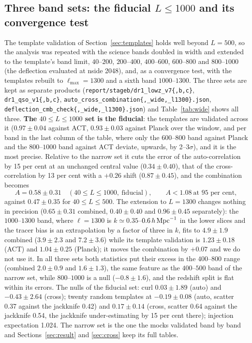 \documentclass[11pt,a4paper]{article}
\begin{document}
\subsection{Three band sets: the fiducial $L\le1000$ and its convergence test}
\label{sec:wide}
The template validation of Section~\ref{sec:templates} holds well beyond $L=500$, so the analysis was repeated with the science bands doubled in width and extended to the template's band limit, $40$--$200$, $200$--$400$, $400$--$600$, $600$--$800$ and $800$--$1000$ (the deflection evaluated at nside 2048), and, as a convergence test, with the templates rebuilt to $\ell_{\max}=1300$ and a sixth band $1000$--$1300$. The three sets are kept as separate products (\texttt{report/stageb/dr1\_lowz\_v7\{,b,c\}}, \texttt{dr1\_qso\_v1\{,b,c\}}, \texttt{auto\_cross\_combination\{,\_wide,\_l1300\}.json}, \texttt{deflection\_cmb\_check\{,\_wide,\_l1300\}.json}) and Table~\ref{tab:wide} shows all three. \textbf{The $40\le L\le1000$ set is the fiducial}: the templates are validated across it ($0.97\pm0.04$ against ACT, $0.93\pm0.03$ against Planck over the window, and per band in the last column of the table, where only the $600$--$800$ band against Planck and the $800$--$1000$ band against ACT deviate, upwards, by 2--3$\sigma$), and it is the most precise. Relative to the narrow set it cuts the error of the auto-correlation by 15 per cent at an unchanged central value ($0.34\pm0.40$), that of the cross-correlation by 13 per cent with a $+0.26$ shift ($0.87\pm0.45$), and the combination becomes
\begin{equation}
A=0.58\pm0.31\quad(40\le L\le1000,\ \text{fiducial}),\qquad A<1.08\ \text{at 95 per cent},
\end{equation}
against $0.47\pm0.35$ for $40\le L\le500$. The extension to $L=1300$ changes nothing in precision ($0.65\pm0.31$ combined, $0.40\pm0.40$ and $0.96\pm0.45$ separately): the $1000$--$1300$ band, where $\ell=1300$ is $k\simeq0.35$--$0.6\,h\,{\rm Mpc}^{-1}$ in the lower slices and the tracer bias is an extrapolation by a factor of three in $k$, fits to $4.9\pm1.9$ combined ($3.9\pm2.3$ and $7.2\pm3.6$) while its template validation is $1.23\pm0.18$ (ACT) and $1.04\pm0.25$ (Planck); it moves the combination by $+0.07$ and we do not use it. In all three sets both statistics put their excess in the $400$--$800$ range (combined $2.0\pm0.9$ and $1.6\pm1.3$), the same feature as the $400$--$500$ band of the narrow set, while $800$--$1000$ is a null ($-0.8\pm1.6$), and the redshift split is flat within its errors. The nulls of the fiducial set: curl $0.03\pm1.89$ (auto) and $-0.43\pm2.64$ (cross); twenty random templates at $-0.19\pm0.08$ (auto, scatter 0.37 against the jackknife 0.42) and $0.17\pm0.14$ (cross, scatter 0.64 against the jackknife 0.54, the jackknife under-estimating by 15 per cent there); injection expectation 1.024. The narrow set is the one the mocks validated band by band and Sections~\ref{sec:result} and \ref{sec:cross} keep its full tables.
\end{document}

